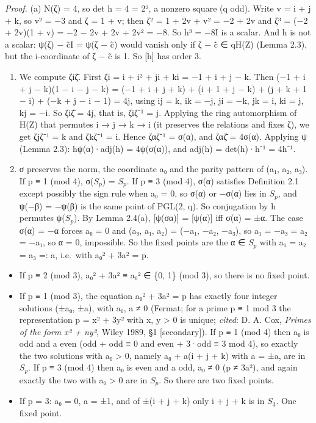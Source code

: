 \documentclass[
  10pt,
]{article}
\providecommand{\tightlist}{%
  \setlength{\itemsep}{0pt}\setlength{\parskip}{0pt}}
\begin{document}
\emph{Proof.} (a) N(ζ) = 4, so det h = 4 = 2², a nonzero square (q odd).
Write v = i + j + k, so v² = −3 and ζ = 1 + v; then ζ² = 1 + 2v + v² =
−2 + 2v and ζ³ = (−2 + 2v)(1 + v) = −2 − 2v + 2v + 2v² = −8. So h³ = −8I
is a scalar. And h is not a scalar: ψ(ζ) − c̃I = ψ(ζ − c̃) would vanish
only if ζ − c̃ ∈ qH(Z) (Lemma 2.3), but the i-coordinate of ζ − c̃ is 1.
So {[}h{]} has order 3.

\begin{enumerate}
\def\labelenumi{(\alph{enumi})}
\setcounter{enumi}{1}
\item
  We compute ζiζ̄. First ζi = i + i² + ji + ki = −1 + i + j − k. Then (−1
  + i + j − k)(1 − i − j − k) = (−1 + i + j + k) + (i + 1 + j − k) + (j
  + k + 1 − i) + (−k + j − i − 1) = 4j, using ij = k, ik = −j, ji = −k,
  jk = i, ki = j, kj = −i. So ζiζ̄ = 4j, that is, ζiζ⁻¹ = j. Applying the
  ring automorphism of H(Z) that permutes i → j → k → i (it preserves
  the relations and fixes ζ), we get ζjζ⁻¹ = k and ζkζ⁻¹ = i. Hence
  ζαζ⁻¹ = σ(α), and ζαζ̄ = 4σ(α). Applying ψ (Lemma 2.3): hψ(α)·adj(h) =
  4ψ(σ(α)), and adj(h) = det(h)·h⁻¹ = 4h⁻¹.
\item
  σ preserves the norm, the coordinate a₀ and the parity pattern of (a₁,
  a₂, a₃). If p ≡ 1 (mod 4), σ(\(S_{p}\)) = \(S_{p}\). If p ≡ 3 (mod 4),
  σ(α) satisfies Definition 2.1 except possibly the sign rule when a₀ =
  0, so σ(α) or −σ(α) lies in \(S_{p}\), and ψ(−β) = −ψ(β) is the same
  point of PGL(2, q). So conjugation by h permutes ψ(\(S_{p}\)). By
  Lemma 2.4(a), {[}ψ(σα){]} = {[}ψ(α){]} iff σ(α) = ±α. The case σ(α) =
  −α forces a₀ = 0 and (a₃, a₁, a₂) = (−a₁, −a₂, −a₃), so a₁ = −a₃ = a₂
  = −a₁, so α = 0, impossible. So the fixed points are the α ∈ \(S_{p}\)
  with a₁ = a₂ = a₃ =: a, i.e.~with a₀² + 3a² = p.
\end{enumerate}

\begin{itemize}
\tightlist
\item
  If p ≡ 2 (mod 3), a₀² + 3a² ≡ a₀² ∈ \{0, 1\} (mod 3), so there is no
  fixed point.
\item
  If p ≡ 1 (mod 3), the equation a₀² + 3a² = p has exactly four integer
  solutions (±a₀, ±a), with a₀, a ≠ 0 (Fermat; for a prime p ≡ 1 mod 3
  the representation p = x² + 3y² with x, y \textgreater{} 0 is unique;
  \emph{cited}: D. A. Cox, \emph{Primes of the form x² + ny²}, Wiley
  1989, §1 {[}secondary{]}). If p ≡ 1 (mod 4) then a₀ is odd and a even
  (odd + odd ≡ 0 and even + 3·odd ≡ 3 mod 4), so exactly the two
  solutions with a₀ \textgreater{} 0, namely a₀ + a(i + j + k) with a =
  ±\textbar a\textbar, are in \(S_{p}\). If p ≡ 3 (mod 4) then a₀ is
  even and a odd, a₀ ≠ 0 (p ≠ 3a²), and again exactly the two with a₀
  \textgreater{} 0 are in \(S_{p}\). So there are two fixed points.
\item
  If p = 3: a₀ = 0, a = ±1, and of ±(i + j + k) only i + j + k is in
  \(S_{3}\). One fixed point.
\end{itemize}
\end{document}
